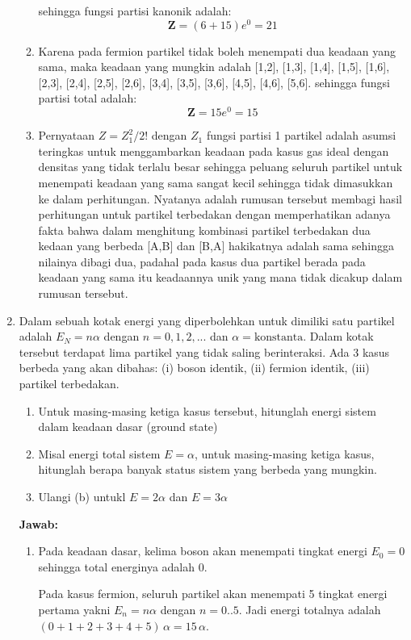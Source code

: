 \documentclass[a4paper , 12 pt]{article}
\begin{document}
\begin{enumerate}
\begin{enumerate}
sehingga fungsi partisi kanonik adalah:
\[
\boldsymbol{Z} = (6 + 15)e^{0} = 21  
\]
\item Karena pada fermion partikel tidak boleh menempati dua keadaan yang sama, maka  keadaan yang mungkin adalah [1,2], [1,3], [1,4], [1,5], [1,6], [2,3], [2,4], [2,5], [2,6], [3,4], [3,5], [3,6], [4,5], [4,6], [5,6]. sehingga fungsi partisi total adalah:
\[
\boldsymbol{Z} = 15e^{0} = 15 
\]
\item Pernyataan $Z = Z_1^2/ 2!$ dengan $Z_1$ fungsi partisi 1 partikel adalah asumsi teringkas untuk menggambarkan keadaan pada kasus gas ideal dengan densitas yang tidak terlalu besar sehingga peluang seluruh partikel untuk menempati keadaan yang sama sangat kecil sehingga tidak dimasukkan ke dalam perhitungan. Nyatanya adalah rumusan tersebut membagi hasil perhitungan untuk partikel terbedakan dengan memperhatikan adanya fakta bahwa dalam menghitung kombinasi partikel terbedakan dua kedaan yang   berbeda [A,B] dan [B,A] hakikatnya adalah sama sehingga nilainya dibagi dua, padahal pada kasus dua partikel berada pada keadaan yang sama itu keadaannya unik yang mana tidak dicakup dalam rumusan tersebut. 
\end{enumerate}
\item Dalam sebuah kotak energi yang diperbolehkan untuk dimiliki satu partikel adalah $E_N  = n \alpha$ dengan $n = 0,1,2, ...$ dan $\alpha = \text{konstanta}$. Dalam kotak tersebut terdapat lima partikel yang tidak saling berinteraksi. Ada 3 kasus berbeda yang akan dibahas: (i) boson identik, (ii) fermion identik, (iii) partikel terbedakan. 
\begin{enumerate}
\item Untuk masing-masing ketiga kasus tersebut, hitunglah energi sistem dalam keadaan dasar (ground state)
\item Misal energi total sistem $E = \alpha $, untuk masing-masing ketiga kasus, hitunglah berapa banyak status sistem yang berbeda yang mungkin. 
\item Ulangi (b) untukl $E = 2 \alpha $ dan $E = 3\alpha$ 
\end{enumerate}
\textbf{Jawab:}
\begin{enumerate}
\item Pada keadaan dasar, kelima boson akan menempati tingkat energi $E_0 = 0$ sehingga total energinya adalah 0.

Pada kasus fermion, seluruh partikel akan menempati 5 tingkat energi pertama yakni $E_n = n\alpha$ dengan $n = 0..5$. Jadi energi totalnya adalah $(0 + 1 + 2 + 3 + 4 + 5)\,\alpha = 15 \, \alpha$. 


\end{enumerate}
\end{enumerate}
\end{document}
